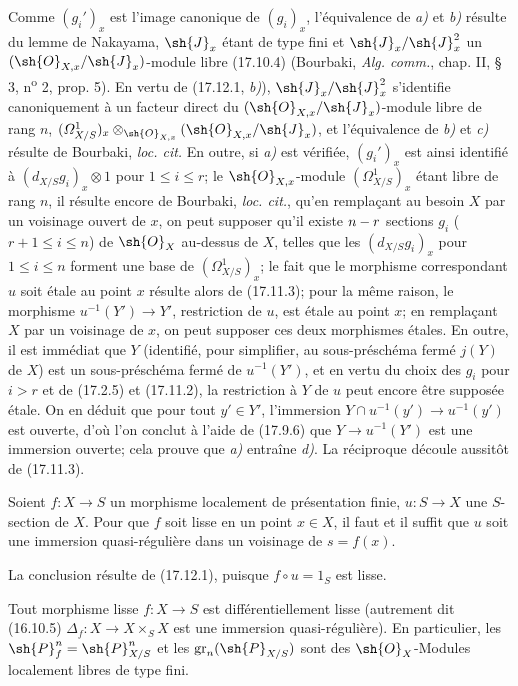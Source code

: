 Comme $(g_i')_x$ est l'image canonique de $(g_i)_x$, l'équivalence de \emph{a)} et \emph{b)} résulte du lemme de Nakayama, $\sh{J}_x$ étant de type fini et $\sh{J}_x/\sh{J}_x^2$ un $(\sh{O}_{X,x}/\sh{J}_x)$-module libre (17.10.4) (Bourbaki, \emph{Alg. comm.}, chap. II, § 3, n\textsuperscript{o} 2, prop. 5). En vertu de (17.12.1, \emph{b)}), $\sh{J}_x/\sh{J}_x^2$ s'identifie canoniquement à un facteur direct du $(\sh{O}_{X,x}/\sh{J}_x)$-module libre de rang $n$, $(\varOmega^1_{X/S})_x\otimes_{\sh{O}_{X,x}}(\sh{O}_{X,x}/\sh{J}_x)$, et l'équivalence de \emph{b)} et \emph{c)} résulte de Bourbaki, \emph{loc. cit.} En outre, si \emph{a)} est vérifiée, $(g_i')_x$ est ainsi identifié à $(d_{X/S}g_i)_x\otimes1$ pour $1\leq i\leq r$; le $\sh{O}_{X,x}$-module $(\varOmega^1_{X/S})_x$ étant libre de rang $n$, il résulte encore de Bourbaki, \emph{loc. cit.}, qu'en remplaçant au besoin $X$ par un voisinage ouvert de $x$, on peut supposer qu'il existe $n- r$ sections $g_i$ ($r+1\leq i\leq n$) de $\sh{O}_X$ au-dessus de $X$, telles que les $(d_{X/S}g_i)_x$ pour $1\leq i\leq n$ forment une base de $(\varOmega^1_{X/S})_x$; le fait que le morphisme correspondant $u$ soit étale au point $x$ résulte alors de (17.11.3); pour la même raison, le morphisme $u^{-1}(Y')\to Y'$, restriction de $u$, est étale au point $x$; en remplaçant $X$ par un voisinage de $x$, on peut supposer ces deux morphismes étales. En outre, il est immédiat que $Y$ (identifié, pour simplifier, au sous-préschéma fermé $j(Y)$ de $X$) est un sous-préschéma fermé de $u^{-1}(Y')$, et en vertu du choix des $g_i$ pour $i>r$ et de (17.2.5) et (17.11.2), la restriction à $Y$ de $u$ peut encore être supposée étale. On en déduit que pour tout $y'\in Y'$, l'immersion $Y\cap u^{-1}(y')\to u^{-1}(y')$ est ouverte, d'où l'on conclut à l'aide de (17.9.6) que $Y\to u^{-1}(Y')$ est une immersion ouverte; cela prouve que \emph{a)} entraîne \emph{d)}. La réciproque découle aussitôt de (17.11.3).

\begin{corollary}[17.12.3]
\label{IV.17.12.3}
Soient $f:X\to S$ un morphisme localement de présentation finie, $u:S\to X$ une $S$-section de $X$. Pour que $f$ soit lisse en un point $x\in X$, il faut et il suffit que $u$ soit une immersion quasi-régulière dans un voisinage de $s=f(x)$.
\end{corollary}

La conclusion résulte de (17.12.1), puisque $f\circ u=1_S$ est lisse.

\begin{proposition}[17.12.4]
\label{IV.17.12.4}
Tout morphisme lisse $f:X\to S$ est différentiellement lisse \textup{(autrement dit (16.10.5) $\Delta_f:X\to X\times_SX$ est une immersion quasi-régulière)}. En particulier, les $\sh{P}_f^n=\sh{P}_{X/S}^n$ et les $\operatorname{gr}_n(\sh{P}_{X/S})$ sont des $\sh{O}_X$-Modules localement libres de type fini.
\end{proposition}

